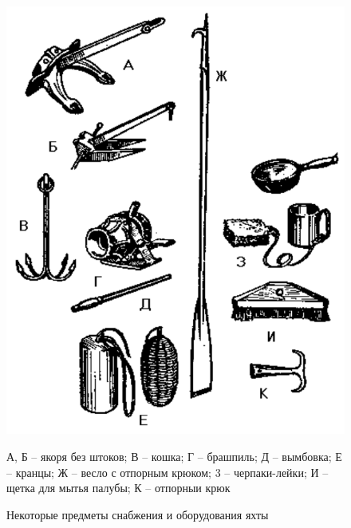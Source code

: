 \documentclass[a4paper, 12pt, twoside, final]{scrbook}
\begin{document}
\begin{figure}[htbp]
   \centering
   \includegraphics[scale=1.5]{54_Nekotorye_predmety} %
   \caption{Некоторые предметы снабжения и оборудования яхты}
   \label{fig:54}
   \centering \small
   А, Б \--- якоря без штоков; В \--- кошка; Г \--- брашпиль; Д \--- вымбовка; Е \--- кранцы; Ж \--- весло с отпорным крюком; 3 \--- черпаки-лейки; И \--- щетка для мытья палубы; К \--- отпорныи крюк
\end{figure}
\end{document}
